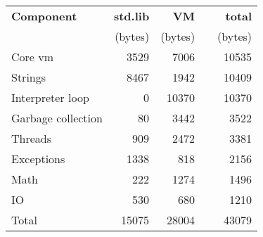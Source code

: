 \begin{tabular}{l|r|r|cr}
    \toprule
    \bfseries Component   & \bfseries std.lib & \bfseries VM & & \bfseries total \\
                          & (bytes)                   & (bytes)              & & (bytes)  \\
    \midrule\midrule
    Core vm               &  3529                     &  7006                & &           10535 \\
    Strings               &  8467                     &  1942                & &           10409 \\
    Interpreter loop      &     0                     & 10370                & &           10370 \\
    Garbage collection    &    80                     &  3442                & &            3522 \\
    Threads               &   909                     &  2472                & &            3381 \\
    Exceptions            &  1338                     &   818                & &            2156 \\
    Math                  &   222                     &  1274                & &            1496 \\
    IO                    &   530                     &   680                & &            1210 \\
    Total                 & 15075                     & 28004                & &           43079 \\
    \bottomrule
\end{tabular}